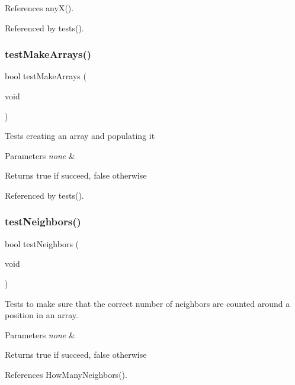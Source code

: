 References any\+X().



Referenced by tests().

\mbox{\label{tests_8h_af6e338851f3ccb4714e1bfb06ec4b428}} 
\subsubsection{test\+Make\+Arrays()}
{\footnotesize\ttfamily bool test\+Make\+Arrays (\begin{DoxyParamCaption}\item[{void}]{ }\end{DoxyParamCaption})}

Tests creating an array and populating it 
\begin{DoxyParams}{Parameters}
{\em none} & \\
\hline
\end{DoxyParams}
\begin{DoxyReturn}{Returns}
true if succeed, false otherwise 
\end{DoxyReturn}


Referenced by tests().

\mbox{\label{tests_8h_a3809ae80cb3300c9a6d248b7db6a1a99}} 
\subsubsection{test\+Neighbors()}
{\footnotesize\ttfamily bool test\+Neighbors (\begin{DoxyParamCaption}\item[{void}]{ }\end{DoxyParamCaption})}

Tests to make sure that the correct number of neighbors are counted around a position in an array. 
\begin{DoxyParams}{Parameters}
{\em none} & \\
\hline
\end{DoxyParams}
\begin{DoxyReturn}{Returns}
true if succeed, false otherwise 
\end{DoxyReturn}


References How\+Many\+Neighbors().



